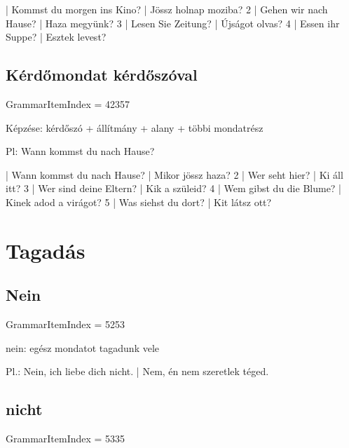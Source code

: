 \documentclass{article}
\newenvironment{desc}{\verbatim}{\endverbatim}
\newenvironment{exmp}{\verbatim}{\endverbatim}
\begin{document}
\begin{exmp}
1 | Kommst du morgen ins Kino? | Jössz holnap moziba?
2 | Gehen wir nach Hause? | Haza megyünk?
3 | Lesen Sie Zeitung? | Újságot olvas?
4 | Essen ihr Suppe? | Esztek levest?
\end{exmp}

\subsection{Kérdőmondat kérdőszóval}

GrammarItemIndex = 42357

\begin{desc}
Képzése: kérdőszó + állítmány + alany + többi mondatrész

Pl: Wann kommst du nach Hause?
\end{desc}

\begin{exmp}
1 | Wann kommst du nach Hause? | Mikor jössz haza?
2 | Wer seht hier? | Ki áll itt?
3 | Wer sind deine Eltern? | Kik a szüleid?
4 | Wem gibst du die Blume? | Kinek adod a virágot?
5 | Was siehst du dort? | Kit látsz ott?
\end{exmp}

\section{Tagadás}

\subsection{Nein}

GrammarItemIndex = 5253

\begin{desc}
nein: egész mondatot tagadunk vele

Pl.: Nein, ich liebe dich nicht. | Nem, én nem szeretlek téged.
\end{desc}

\subsection{nicht}

GrammarItemIndex = 5335
\end{document}
